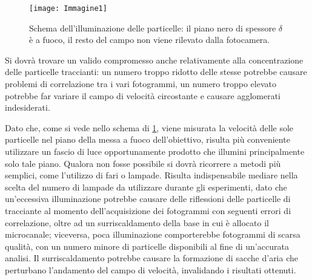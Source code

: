 \documentclass{article} %
\begin{document}
\begin{figure}[h!]
	\centering
	\texttt{[image: Immagine1]}
	\caption{Schema dell'illuminazione delle particelle: il piano nero di spessore $\delta$ è a fuoco, il resto del campo non viene rilevato dalla fotocamera.}
	\label{fig:Geometria}
\end{figure}
Si dovrà trovare un valido compromesso anche relativamente alla concentrazione delle particelle traccianti: un numero troppo ridotto delle stesse potrebbe causare problemi di correlazione tra i vari fotogrammi, un numero troppo elevato potrebbe far variare il campo di velocità circostante e causare agglomerati indesiderati.\par
Dato che, come si vede nello schema di \cref{fig:Geometria}, viene misurata la velocità delle sole particelle nel piano della messa a fuoco dell'obiettivo, risulta più conveniente utilizzare un fascio di luce opportunamente prodotto che illumini principalmente solo tale piano. Qualora non fosse possibile si dovrà ricorrere a metodi più semplici, come l'utilizzo di fari o lampade. Risulta indispensabile mediare nella scelta del numero di lampade da utilizzare durante gli esperimenti,  dato che un'eccessiva illuminazione potrebbe causare delle riflessioni delle particelle di tracciante al momento dell'acquisizione dei fotogrammi con seguenti errori di correlazione, oltre ad un surriscaldamento della base in cui è allocato il microcanale; viceversa, poca illuminazione comporterebbe fotogrammi di scarsa qualità, con un numero minore di particelle disponibili al fine di un'accurata analisi. Il surriscaldamento potrebbe causare la formazione di sacche d'aria che perturbano l'andamento del campo di velocità, invalidando i risultati ottenuti.\par
\end{document}
